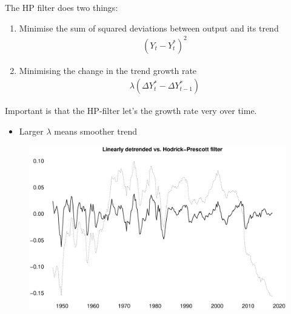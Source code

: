 \documentclass{beamer}
\begin{document}
\begin{frame}
  The HP filter does two things:
  \begin{enumerate}
    \item Minimise the sum of squared deviations between output and its trend
    \begin{align}
      (Y_t - Y_t^*)^2
    \end{align}
    \item Minimising the change in the trend growth rate
    \begin{align}
      \lambda(\Delta Y_t^* - \Delta Y_{t-1}^*)
    \end{align}
  \end{enumerate}
  \medskip
  Important is that the HP-filter let's the growth rate very over time.
  \begin{itemize}
    \item Larger $\lambda$ means smoother trend
  \end{itemize}
\end{frame}

\begin{frame}
  \begin{figure}
    \includegraphics[scale=.3]{hp_filter.eps}
  \end{figure}
\end{frame}
\end{document}
